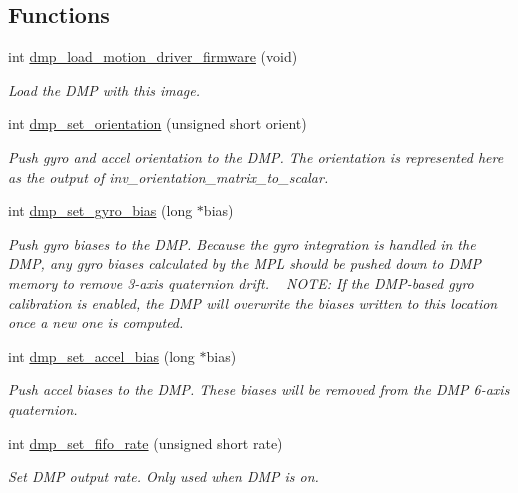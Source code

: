 \subsection*{Functions}
\begin{DoxyCompactItemize}
\item 
int \hyperlink{group___d_r_i_v_e_r_s_ga66626a842452f444e9af29cb0d2c6150}{dmp\+\_\+load\+\_\+motion\+\_\+driver\+\_\+firmware} (void)
\begin{DoxyCompactList}\small\item\em Load the D\+MP with this image. \end{DoxyCompactList}\item 
int \hyperlink{group___d_r_i_v_e_r_s_ga6cb5ff144ce6e1546f00809de8bb24a4}{dmp\+\_\+set\+\_\+orientation} (unsigned short orient)
\begin{DoxyCompactList}\small\item\em Push gyro and accel orientation to the D\+MP. The orientation is represented here as the output of {\itshape inv\+\_\+orientation\+\_\+matrix\+\_\+to\+\_\+scalar}. \end{DoxyCompactList}\item 
int \hyperlink{group___d_r_i_v_e_r_s_ga4766e37ef95cbf0044c8f9594ed811d1}{dmp\+\_\+set\+\_\+gyro\+\_\+bias} (long $\ast$bias)
\begin{DoxyCompactList}\small\item\em Push gyro biases to the D\+MP. Because the gyro integration is handled in the D\+MP, any gyro biases calculated by the M\+PL should be pushed down to D\+MP memory to remove 3-\/axis quaternion drift. ~\newline
 N\+O\+TE\+: If the D\+M\+P-\/based gyro calibration is enabled, the D\+MP will overwrite the biases written to this location once a new one is computed. \end{DoxyCompactList}\item 
int \hyperlink{group___d_r_i_v_e_r_s_gafbd714aee6086836f70aaea847771669}{dmp\+\_\+set\+\_\+accel\+\_\+bias} (long $\ast$bias)
\begin{DoxyCompactList}\small\item\em Push accel biases to the D\+MP. These biases will be removed from the D\+MP 6-\/axis quaternion. \end{DoxyCompactList}\item 
int \hyperlink{group___d_r_i_v_e_r_s_ga5399728fd572a7694af20286cc9d4121}{dmp\+\_\+set\+\_\+fifo\+\_\+rate} (unsigned short rate)
\begin{DoxyCompactList}\small\item\em Set D\+MP output rate. Only used when D\+MP is on. \end{DoxyCompactList}\item 

\end{DoxyCompactItemize}
